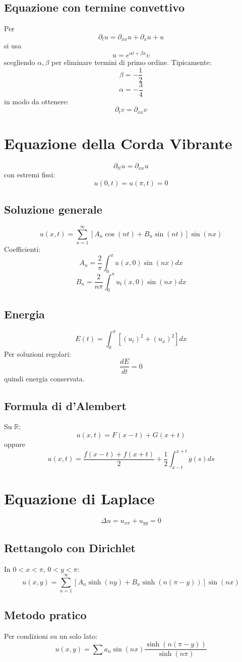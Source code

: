 \documentclass[a4paper,10pt]{article}
\begin{document}
\subsection{Equazione con termine convettivo}
Per
\[\partial_tu=\partial_{xx}u+\partial_xu+u\]
si usa
\[u=e^{\alpha t+\beta x}v\]
scegliendo $\alpha,\beta$ per eliminare termini di primo ordine.
Tipicamente:
\[\beta=-\frac12\]
\[\alpha=-\frac34\]
in modo da ottenere:
\[\partial_t v=\partial_{xx}v\]
\section{Equazione della Corda Vibrante}
\[\partial_{tt}u=\partial_{xx}u\]
con estremi fissi:
\[u(0,t)=u(\pi,t)=0\]
\subsection{Soluzione generale}
\[u(x,t)=\sum_{n=1}^{\infty}
\left[
A_n\cos(nt)+B_n\sin(nt)
\right]\sin(nx)\]
Coefficienti:
\[A_n=\frac2\pi\int_0^{\pi}u(x,0)\sin(nx)dx\]
\[B_n=\frac2{n\pi}\int_0^{\pi}u_t(x,0)\sin(nx)dx\]
\subsection{Energia}
\[E(t)=\int_0^{\pi}
\left[
(u_t)^2+(u_x)^2
\right]dx\]
Per soluzioni regolari:
\[\frac{dE}{dt}=0\]
quindi energia conservata.
\subsection{Formula di d'Alembert}
Su $\mathbb R$:
\[u(x,t)=F(x-t)+G(x+t)\]
oppure
\[u(x,t)=\frac{f(x-t)+f(x+t)}{2}
+\frac12\int_{x-t}^{x+t}g(s)ds\]
\section{Equazione di Laplace}
\[\Delta u=u_{xx}+u_{yy}=0\]
\subsection{Rettangolo con Dirichlet}
In $0<x<\pi$, $0<y<\pi$:
\[u(x,y)=\sum_{n=1}^{\infty}
\left[
A_n\sinh(ny)+B_n\sinh(n(\pi-y))
\right]\sin(nx)\]
\subsection{Metodo pratico}
Per condizioni su un solo lato:
\[u(x,y)=\sum a_n\sin(nx)\frac{\sinh(n(\pi-y))}{\sinh(n\pi)}\]
\end{document}
